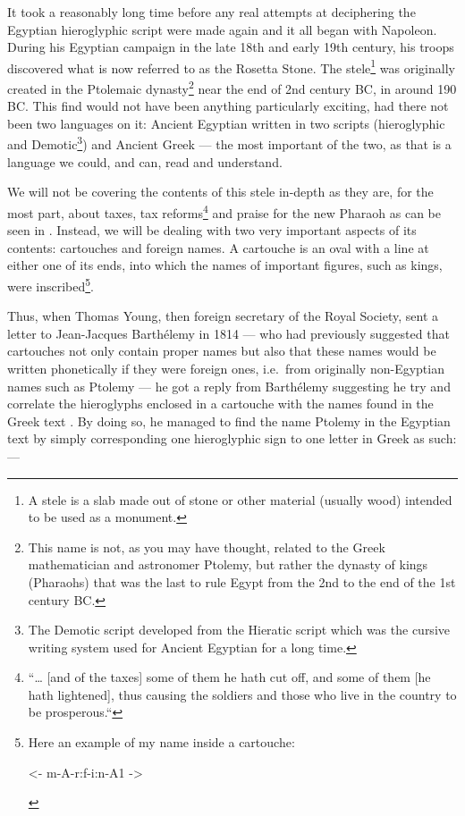 \documentclass[a5paper,twoside,11pt]{report}
\begin{document}
	It took a reasonably long time before any real attempts at deciphering the Egyptian hieroglyphic script were made again and it all began with Napoleon. During his Egyptian campaign in the late 18th and early 19th century, his troops discovered what is now referred to as the Rosetta Stone. The stele\footnote{A stele is a slab made out of stone or other material (usually wood) intended to be used as a monument.} was originally created in the Ptolemaic dynasty\footnote{This name is not, as you may have thought, related to the Greek mathematician and astronomer Ptolemy, but rather the dynasty of kings (Pharaohs) that was the last to rule Egypt from the 2nd to the end of the 1st century BC.} near the end of 2nd century BC, in around 190 BC. This find would not have been anything particularly exciting, had there not been two languages on it: Ancient Egyptian written in two scripts (hieroglyphic and Demotic\footnote{The Demotic script developed from the Hieratic script which was the cursive writing system used for Ancient Egyptian for a long time.}) and Ancient Greek — the most important of the two, as that is a language we could, and can,  read and understand.
	
	We will not be covering the contents of this stele in-depth as they are, for the most part, about taxes, tax reforms\footnote{“… [and of the taxes] some of them he hath cut off, and some of them [he hath lightened], thus causing the soldiers and those who live in the country to be prosperous.“\parencite[p. 202]{nilenotes}} and praise for the new Pharaoh as can be seen in \textcite{nilenotes}. Instead, we will be dealing with two very important aspects of its contents: cartouches and foreign names. A cartouche is an oval with a line at either one of its ends, into which the names of important figures, such as kings, were inscribed\footnote{Here an example of my name inside a cartouche: \SmallerText\SmallerText\begin{hieroglyph}<- m-A-r:f-i:n-A1 ->\end{hieroglyph}}.

	Thus, when Thomas Young, then foreign secretary of the Royal Society, sent a letter to Jean-Jacques Barthélemy in 1814 — who had previously suggested that cartouches not only contain proper names but also that these names would be written phonetically if they were foreign ones, i.e.\ from originally non-Egyptian names such as Ptolemy — he got a reply from Barthélemy suggesting he try and correlate the hieroglyphs enclosed in a cartouche with the names found in the Greek text \parencite[p. 61]{lostlanguages}. By doing so, he managed to find the name Ptolemy in the Egyptian text by simply corresponding one hieroglyphic sign to one letter in Greek as such: —
\end{document}
